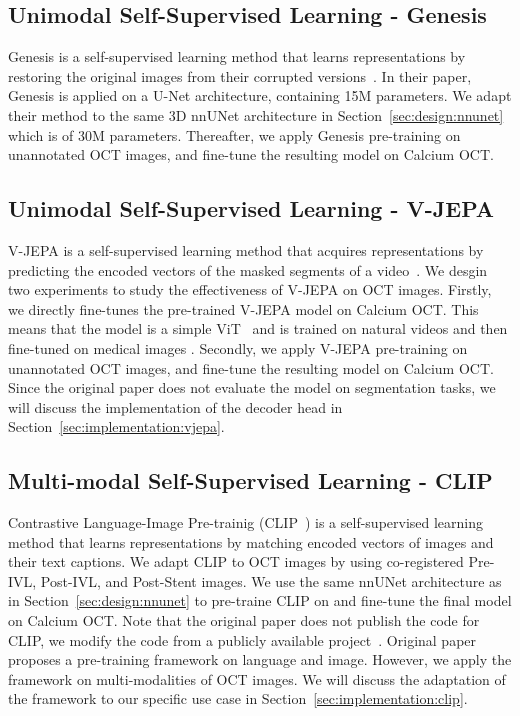 \documentclass[a4paper,11pt,oneside]{report}
\begin{document}
\subsection{Unimodal Self-Supervised Learning - Genesis}
Genesis is a self-supervised learning method that learns representations by restoring the original images from their corrupted versions~\cite{Zhou2021}. In their paper, Genesis is applied on a U-Net architecture, containing 15M parameters. We adapt their method to the same 3D nnUNet architecture in Section~\ref{sec:design:nnunet} which is of 30M parameters. Thereafter, we apply Genesis pre-training on unannotated OCT images, and fine-tune the resulting model on Calcium OCT.


\subsection{Unimodal Self-Supervised Learning - V-JEPA}
V-JEPA is a self-supervised learning method that acquires representations by predicting the encoded vectors of the masked segments of a video~\cite{Bardes2024Vjepa}. We desgin two experiments to study the effectiveness of V-JEPA on OCT images. Firstly, we directly fine-tunes the pre-trained V-JEPA model on Calcium OCT. This means that the model is a simple ViT~\cite{Dosovitskiy2020vit} and is trained on natural videos and then fine-tuned on medical images . Secondly, we apply V-JEPA pre-training on unannotated OCT images, and fine-tune the resulting model on Calcium OCT. Since the original paper does not evaluate the model on segmentation tasks, we will discuss the implementation of the decoder head in Section~\ref{sec:implementation:vjepa}.


\subsection{Multi-modal Self-Supervised Learning - CLIP}
Contrastive Language-Image Pre-trainig (CLIP~\cite{Radford2021CLIP}) is a self-supervised learning method that learns representations by matching encoded vectors of images and their text captions. We adapt CLIP to OCT images by using co-registered Pre-IVL, Post-IVL, and Post-Stent images. We use the same nnUNet architecture as in Section~\ref{sec:design:nnunet} to pre-traine CLIP on and fine-tune the final model on Calcium OCT. Note that the original paper does not publish the code for CLIP, we modify the code from a publicly available project~\cite{Shariatnia2021}. Original paper proposes a pre-training framework on language and image. However, we apply the framework on multi-modalities of OCT images. We will discuss the adaptation of the framework to our specific use case in Section~\ref{sec:implementation:clip}.
\end{document}
